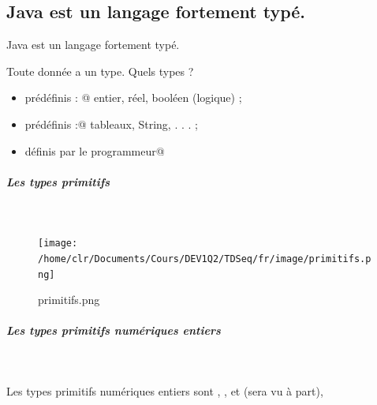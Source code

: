 \documentclass[11pt,a4paper]{article}
\begin{document}
				\subsection{Java est un langage fortement typ\'e.}
			    Java est un langage fortement typ\'e.
			  
            \par
        
          Toute donn\'ee a un type. Quels types ?
          
					\begin{itemize}
				
			\item \verb@primitifs prédéfinis : @ entier, r\'eel, bool\'een (logique) ;
			\item {} prédéfinis :@ tableaux, String, . . . ;
			\item {} définis par le programmeur@
					\end{itemize}
				
            \par
        
			
		\subparagraph{Les types primitifs} 
		
					\textcolor{white}{.} \par
				
            \par
        \begin{figure}[hbt]
				    \begin{center}
					\texttt{[image: /home/clr/Documents/Cours/DEV1Q2/TDSeq/fr/image/primitifs.png]}
						\end{center}
                
                    \caption[primitifs.png]{primitifs.png}
                \end{figure}
                    
            \par
        
			
		\subparagraph{Les types primitifs num\'eriques entiers} 
		
					\textcolor{white}{.} \par
				
            \par
        
          Les types primitifs num\'eriques entiers sont
          \verb@byte@, \verb@short@, 
          \verb@int@ et \verb@long@ (\verb@char@ sera vu \`a part),
          
\end{document}
